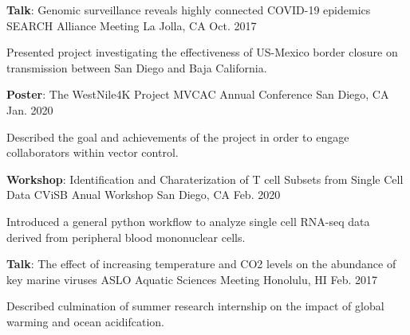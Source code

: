 
\begin{cventries}
    \cventry
    {\textbf{Talk}: Genomic surveillance reveals highly connected COVID-19 epidemics} %
    {SEARCH Alliance Meeting} %
    {La Jolla, CA} %
    {Oct. 2017} %
    {
      \begin{cvitems} %
        \item{Presented project investigating the effectiveness of US-Mexico border closure on transmission between San Diego and Baja California.}
      \end{cvitems}
    }
    
  \cventry
    {\textbf{Poster}: The WestNile4K Project} %
    {MVCAC Annual Conference} %
    {San Diego, CA} %
    {Jan. 2020} %
    {
      \begin{cvitems} %
        \item {Described the goal and achievements of the project in order to engage collaborators within vector control.}
      \end{cvitems}
    }

  \cventry
    {\textbf{Workshop}: Identification and Charaterization of T cell Subsets from Single Cell Data} %
    {CViSB Anual Workshop} %
    {San Diego, CA} %
    {Feb. 2020} %
    {
      \begin{cvitems} %
        \item {Introduced a general python workflow to analyze single cell RNA-seq data derived from peripheral blood mononuclear cells.}
      \end{cvitems}
    }

  \cventry
    {\textbf{Talk}: The effect of increasing temperature and CO2 levels on the abundance of key marine viruses} %
    {ASLO Aquatic Sciences Meeting} %
    {Honolulu, HI} %
    {Feb. 2017} %
    {
      \begin{cvitems} %
        \item {Described culmination of summer research internship on the impact of global warming and ocean acidifcation.}
      \end{cvitems}
    }

\end{cventries}
